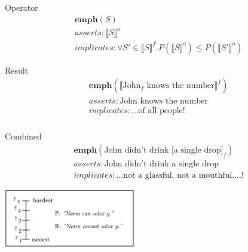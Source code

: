 \documentclass[compress]{beamer}
\newcommand{\inter}[1]{\ensuremath{\llbracket#1\rrbracket}}
\begin{document}
\begin{frame}
\frametitle{\cite{eckardt2006}}
  \begin{block}{Operator}
    \begin{equation}
      \begin{split}
         & \mathbf{emph}(S)\\  
         & asserts: \inter{S}^o \\
	 & implicates: \forall S' \in \inter{S}^f . P(\inter{S}^o) \leq P(\inter{S'}^o)
      \end{split}
    \end{equation}   
  \end{block}
    \begin{block}{Result}
    \begin{equation}
      \begin{split}
         & \mathbf{emph}(\inter{\text{John$_f$ knows the number}}^f)\\  
         & asserts: \text{John knows the number} \\
	 & implicates: \text{...of all people!}
      \end{split}
    \end{equation}   
    \end{block}
\end{frame}

\begin{frame}
\frametitle{\cite{eckardt2006}}
  \begin{block}{Combined}
    \begin{equation}
      \begin{split}
         & \mathbf{emph}(\text{John didn't drink [a single drop]}_f)\\  
         & asserts: \text{John didn't drink a single drop}\\
	 & implicates: \text{...not a glassful, not a mouthful,...!}
      \end{split}
    \end{equation}
  \end{block}
\end{frame}


\begin{frame}{\cite{fauconnier1975}}
\begin{center}
	\includegraphics[height=1in]{israel.png}   
     \end{center}
\end{frame}
\end{document}
